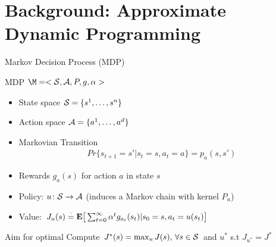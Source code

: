 \documentclass[10pt]{beamer}
\begin{document}
\section{Background: Approximate Dynamic Programming}

\begin{frame}[fragile]{Markov Decision Process (MDP)}
\begin{block}{MDP $\M=<\S,\A,P,g,\alpha>$}
\begin{itemize}
\item State space $\S=\{s^1,\ldots,s^n\}$
\item Action space $\A=\{a^1,\ldots,a^d\}$
\item Markovian Transition
\begin{align*}
Pr\{s_{t+1}=s'| s_t=s, a_t=a\}=p_a(s,s')
\end{align*}
\item Rewards $g_a(s)$ for action $a$ in state $s$
\item Policy: $u\colon \S\ra \A$ (induces a Markov chain with kernel $P_u$)
\item Value: $J_u(s)\eqdef \E\big[\sum_{t=0}^\infty \alpha^t g_{a_t}(s_t)|s_0=s,a_t=u(s_t)\big]$
\end{itemize}
\end{block}
\begin{block}{Aim for optimal}
Compute  $J^*(s)=\max_{u} J(s),\,\forall s\in \S$ and $u^*$ s.t $J_{u^*}=J^*$
\end{block}
\end{frame}
\end{document}

